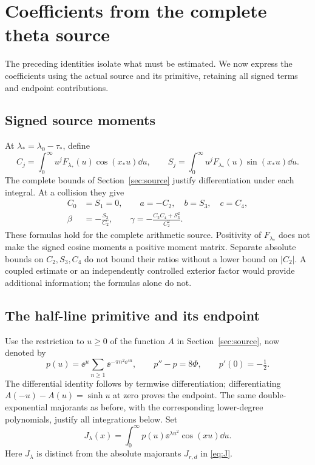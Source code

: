 \section{Coefficients from the complete theta source}\label{sec:coefficients}

The preceding identities isolate what must be estimated. We now
express the coefficients using the actual source and its primitive,
retaining all signed terms and endpoint contributions.

\subsection{Signed source moments}
At \(\lambda_* =\lambda_0-\tau_*\), define
\begin{equation}\label{eq:coefficient-moments}
 C_j=\int_0^\infty u^j F_{\lambda_*}(u)\cos(x_*u)\dd u,
 \qquad
 S_j=\int_0^\infty u^j F_{\lambda_*}(u)\sin(x_*u)\dd u.
\end{equation}
The complete bounds of Section~\ref{sec:source} justify
differentiation under each integral. At a collision they give
\begin{align}
 C_0&=S_1=0,\qquad a=-C_2,\quad b=S_3,\quad c=C_4,
 \label{eq:moment-jets}\\
 \beta&=-\frac{S_3}{C_2},\qquad
 \gamma=-\frac{C_2C_4+S_3^2}{C_2^2}.
 \label{eq:moment-ratios}
\end{align}
These formulas hold for the complete arithmetic source. Positivity
of \(F_{\lambda_*}\) does not make the signed cosine moments a
positive moment matrix. Separate absolute bounds on \(C_2,S_3,C_4\)
do not bound their ratios without a lower bound on \(|C_2|\).
A coupled estimate or an independently controlled exterior factor
would provide additional information; the formulas alone do not.

\subsection{The half-line primitive and its endpoint}
Use the restriction to \(u\ge0\) of the function \(A\) in
Section~\ref{sec:source}, now denoted by
\begin{equation}\label{eq:p-primitive}
 p(u)=\ee^u\sum_{n\ge1}\ee^{-\pi n^2\ee^{4u}},\qquad
 p''-p=8\Phi,\qquad p'(0)=-\tfrac12.
\end{equation}
The differential identity follows by termwise differentiation;
differentiating \(A(-u)-A(u)=\sinh u\) at zero proves the endpoint.
The same double-exponential majorants as before, with the corresponding
lower-degree polynomials, justify all integrations below. Set
\begin{equation}\label{eq:J-primitive}
 J_\lambda(x)=\int_0^\infty p(u)\ee^{\lambda u^2}\cos(xu)\dd u.
\end{equation}
Here \(J_\lambda\) is distinct from the absolute majorants
\(J_{r,d}\) in \eqref{eq:J}.

